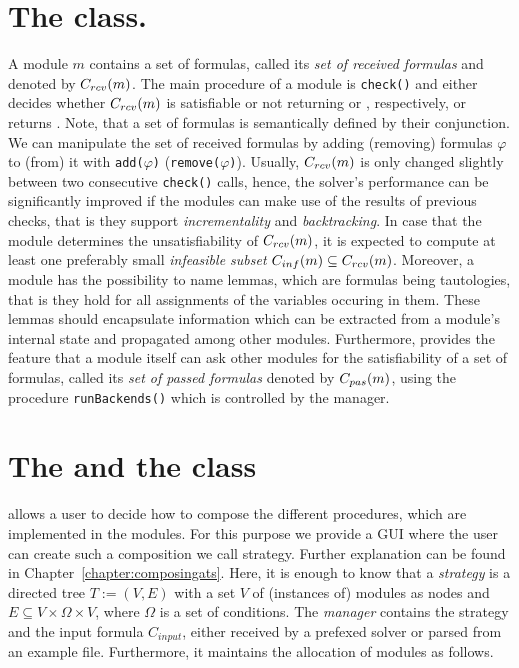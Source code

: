 \section{The \moduleClass class.} A module $m$ contains a set of
formulas, called its \emph{set of received formulas} and denoted by 
$C_{rcv}(m)$. The main
procedure of a module  is \texttt{check()} and either decides
whether $C_{rcv}(m)$ is satisfiable or not returning \SAT or \UNSAT,
respectively, or returns \UNKNOWN. Note, that a set of formulas is
semantically defined by their conjunction. We can manipulate the set
of received formulas by adding (removing) formulas $\varphi$ to (from)
it with \texttt{add($\varphi$)} (\texttt{remove($\varphi$)}). Usually, 
$C_{rcv}(m)$ is only changed slightly between two consecutive 
\texttt{check()} calls, hence, the solver's performance can be significantly improved if the modules can
make use of the results of previous checks, that is they support
\emph{incrementality} and \emph{backtracking}. In case that the module
determines the unsatisfiability of $C_{rcv}(m)$, it is expected to compute
at least one preferably small \emph{infeasible subset} $C_{inf}(m)\subseteq
C_{rcv}(m)$. Moreover, a module has the possibility to name lemmas, which
are formulas being tautologies, that is they hold for all assignments
of the variables occuring in them. These lemmas should encapsulate
information which can be extracted from a module's internal state and
propagated among other \smtrat modules. Furthermore, \smtrat provides
the feature that a module itself can ask other modules for the
satisfiability of a set of formulas, called its \emph{set
of passed formulas} denoted by $C_{pas}(m)$, using the procedure \texttt{runBackends()} which
is controlled by the manager. 

\section{The \managerClass and the \strategyClass class} 
\label{sec:managerstrategy}
\smtrat allows a user to decide how to compose the different procedures,
which are implemented in the modules. For this purpose we provide a GUI
where the user can create such a composition we call strategy. Further
explanation can be found in Chapter~\ref{chapter:composingats}. Here, 
it is enough to know that a \emph{strategy} is a directed tree $T:=(V, E)$ with a set $V$ of
(instances of) modules as nodes and $E\subseteq V\times \Omega\times V$,
where $\Omega$ is a set of conditions. The \emph{manager} contains the
strategy and the input formula $C_{input}$, either received by a prefexed solver
or parsed from an example file. Furthermore, it maintains the
allocation of modules as follows. 

